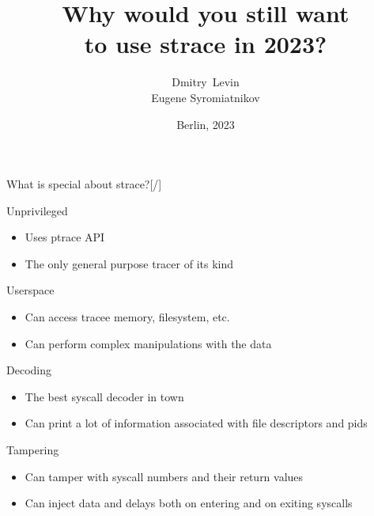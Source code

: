\documentclass[unicode,aspectratio=169,xcolor={table,dvipsnames,usernames}]{beamer}
\title{\Huge Why would you still want \\ to use strace in 2023?}
\author{\LARGE Dmitry~Levin \\ Eugene Syromiatnikov}
\date{\Large Berlin, 2023}
\begin{document}
{
\begin{frame}[noframenumbering]
\titlepage
\end{frame}
}

\begin{frame}{\Large What is special about strace?\hfill [\insertframenumber/\inserttotalframenumber]}
\begin{block}{Unprivileged}
\begin{itemize}
	\item Uses ptrace API
	\item The only general purpose tracer of its kind
\end{itemize}
\end{block}

\begin{block}{Userspace}
\begin{itemize}
	\item Can access tracee memory, filesystem, etc.
	\item Can perform complex manipulations with the data
\end{itemize}
\end{block}

\begin{block}{Decoding}
\begin{itemize}
	\item The best syscall decoder in town
	\item Can print a lot of information associated with file descriptors and pids
\end{itemize}
\end{block}

\begin{block}{Tampering}
\begin{itemize}
	\item Can tamper with syscall numbers and their return values
	\item Can inject data and delays both on entering and on exiting syscalls
\end{itemize}
\end{block}
\end{frame}
\end{document}
